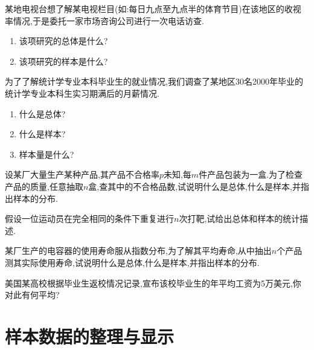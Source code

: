 \begin{xiti}
\item 某地电视台想了解某电视栏目(如:每日九点至九点半的体育节目)在该地区的收视率情况,于是委托一家市场咨询公司进行一次电话访查.
\begin{enumerate}
\item 该项研究的总体是什么?
\item 该项研究的样本是什么?
\end{enumerate}
\item 为了了解统计学专业本科毕业生的就业情况,我们调查了某地区30名2000年毕业的统计学专业本科生实习期满后的月薪情况.
\begin{enumerate}
\item 什么是总体?
\item 什么是样本?
\item 样本量是什么?
\end{enumerate}
\item 设某厂大量生产某种产品,其产品不合格率$p$未知,每$m$件产品包装为一盒.为了检查产品的质量,任意抽取$n$盒,查其中的不合格品数,试说明什么是总体,什么是样本,并指出样本的分布.
\item 假设一位运动员在完全相同的条件下重复进行$n$次打靶,试给出总体和样本的统计描述.
\item 某厂生产的电容器的使用寿命服从指数分布,为了解其平均寿命,从中抽出$n$个产品测其实际使用寿命,试说明什么是总体,什么是样本,并指出样本的分布.
\item 美国某高校根据毕业生返校情况记录,宣布该校毕业生的年平均工资为5万美元,你对此有何平均?
\end{xiti}
\section{样本数据的整理与显示}
